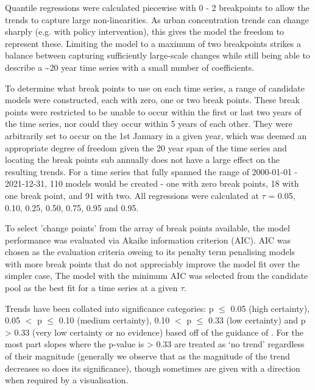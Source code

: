 \documentclass[journal abbreviation, manuscript]{copernicus}
\begin{document}
Quantile regressions were calculated piecewise with 0 - 2 breakpoints to allow the trends to capture large non-linearities. As urban concentration trends can change sharply (e.g. with policy intervention), this gives the model the freedom to represent these. Limiting the model to a maximum of two breakpoints strikes a balance between capturing sufficiently large-scale changes while still being able to describe a \textasciitilde{20} year time series with a small number of coefficients.

To determine what break points to use on each time series, a range of candidate models were constructed, each with zero, one or two break points. These break points were restricted to be unable to occur within the first or last two years of the time series, nor could they occur within 5 years of each other. They were arbitrarily set to occur on the 1st January in a given year, which was deemed an appropriate degree of freedom given the 20 year span of the time series and locating the break points sub annually does not have a large effect on the resulting trends. For a time series that fully spanned the range of 2000-01-01 - 2021-12-31, 110 models would be created - one with zero break points, 18 with one break point, and 91 with two. All regressions were calculated at $\tau$ = 0.05, 0.10, 0.25, 0.50, 0.75, 0.95 and 0.95.

To select 'change points' from the array of break points available, the model performance was evaluated via Akaike information criterion (AIC). AIC was chosen as the evaluation criteria oweing to its penalty term penalising models with more break points that do not appreciably improve the model fit over the simpler case, The model with the minimum AIC was selected from the candidate pool as the best fit for a time series at a given $\tau$. 

Trends have been collated into significance categories: p $\le$ 0.05 (high certainty), 0.05 $<$ p $\le$ 0.10 (medium certainty), 0.10 $<$ p $\le$ 0.33 (low certainty) and p > 0.33 (very low certainty or no evidence) based off of the guidance of \cite{chang2023guidancenotebeststatistical}. For the most part slopes where the p-value is > 0.33 are treated as ‘no trend’ regardless of their magnitude (generally we observe that as the magnitude of the trend decreases so does its significance), though sometimes are given with a direction when required by a visualisation.
\end{document}
